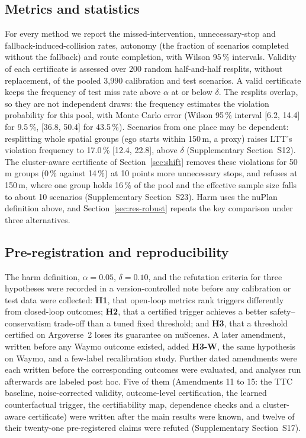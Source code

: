 \documentclass[lettersize,journal]{IEEEtran}
\begin{document}
\subsection{Metrics and statistics}
For every method we report the missed-intervention, unnecessary-stop and
fallback-induced-collision rates, autonomy (the fraction of scenarios
completed without the fallback) and route completion, with Wilson 95\,\%
intervals. Validity of each certificate is assessed over 200 random
half-and-half resplits, without replacement, of the pooled 3{,}990
calibration and test scenarios. A valid certificate keeps the frequency
of test miss rate above $\alpha$ at or below $\delta$. The resplits
overlap, so they are not independent draws: the frequency estimates the
violation probability for this pool, with Monte Carlo error (Wilson
95\,\% interval [6.2, 14.4] for 9.5\,\%, [36.8, 50.4] for 43.5\,\%).
Scenarios from one place may be dependent: resplitting whole spatial
groups (ego starts within 150\,m, a proxy) raises LTT's violation
frequency to 17.0\,\% [12.4, 22.8], above $\delta$ (Supplementary
Section~S12). The cluster-aware certificate of Section~\ref{sec:shift} removes these violations for 50\,m groups (0\,\% against 14\,\%) at 10 points more unnecessary stops, and refuses at 150\,m, where one group holds 16\,\% of the pool and the effective sample size falls to about 10 scenarios (Supplementary Section~S23). Harm uses the nuPlan definition above, and
Section~\ref{sec:res-robust} repeats the key comparison under three
alternatives.

\subsection{Pre-registration and reproducibility}
\label{sec:prereg}
The harm definition, $\alpha = 0.05$, $\delta = 0.10$, and the refutation
criteria for three hypotheses were recorded in a version-controlled note
before any calibration or test data were collected: \textbf{H1}, that
open-loop metrics rank triggers differently from closed-loop outcomes;
\textbf{H2}, that a certified trigger achieves a better
safety--conservatism trade-off than a tuned fixed threshold; and
\textbf{H3}, that a threshold certified on Argoverse~2 loses its
guarantee on nuScenes. A later amendment, written before any Waymo
outcome existed, added \textbf{H3-W}, the same hypothesis on Waymo, and
a few-label recalibration study. Further dated amendments were each written before the corresponding outcomes
were evaluated, and analyses run afterwards are labeled post hoc. Five of
them (Amendments 11 to 15: the TTC baseline, noise-corrected validity,
outcome-level certification, the learned counterfactual trigger, the
certifiability map, dependence checks and a cluster-aware certificate) were
written after the main results were known, and twelve of their twenty-one
pre-registered claims were refuted (Supplementary
Section~S17).
\end{document}

